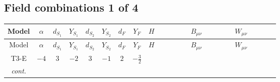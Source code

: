 \documentclass[8pt]{article}
\begin{document}
\begin{landscape}
\subsection*{Field combinations 1 of 4}
\begin{longtable}{@{}cccccccc >{\raggedright\arraybackslash}p{0.21\linewidth} >{\raggedright\arraybackslash}p{0.21\linewidth} >{\raggedright\arraybackslash}p{0.21\linewidth}@{}}
\toprule
Model & $\alpha$ & $d_{S_1}$ & $Y_{S_1}$ & $d_{S_2}$ & $Y_{S_2}$ & $d_F$ & $Y_F$ & $H$ & $B_{\mu\nu}$ & $W_{\mu\nu}$ \\
\midrule
\endfirsthead
\toprule
Model & $\alpha$ & $d_{S_1}$ & $Y_{S_1}$ & $d_{S_2}$ & $Y_{S_2}$ & $d_F$ & $Y_F$ & $H$ & $B_{\mu\nu}$ & $W_{\mu\nu}$ \\
\midrule
\endhead
T3-E & $-4$ & $3$ & $-2$ & $3$ & $-1$ & $2$ & $-\frac{3}{2}$ & \scriptsize\adjustbox{max width=\linewidth}{$\begin{gathered} +C_{\text{H2}} H_{a_1} H_{a_1}{}^{\dagger } \\ -H_{a_1} \mu ^2 H_{a_1}{}^{\dagger } \\ +\frac{2 \hbar  \overline{\lambda_5} H_{a_1} H_{a_2} \lambda_5 H_{a_1}{}^{\dagger } H_{a_2}{}^{\dagger }}{\epsilon }\end{gathered}$} & \scriptsize\adjustbox{max width=\linewidth}{$\begin{gathered} -\frac{23 \hbar  B_{\mu _1\mu _2}^2}{4 \epsilon } \\ -\hbar  \log \left(\frac{\bar{\mu}^{2}}{m_1^2}\right) B_{\mu _1\mu _2}^2 \\ -\frac{1}{4} \hbar  \log \left(\frac{\bar{\mu}^{2}}{m_2^2}\right) B_{\mu _1\mu _2}^2\end{gathered}$} & \scriptsize\adjustbox{max width=\linewidth}{$\begin{gathered} -\frac{5 \hbar  \left(W_{\mu _1\mu _2}^{A_1}\right){}^2}{6 \epsilon } \\ -\frac{1}{6} \hbar  \log \left(\frac{\bar{\mu}^{2}}{m_1^2}\right) \left(W_{\mu _1\mu _2}^{A_1}\right){}^2 \\ -\frac{1}{6} \hbar  \log \left(\frac{\bar{\mu}^{2}}{m_2^2}\right) \left(W_{\mu _1\mu _2}^{A_1}\right){}^2\end{gathered}$} \\
\textit{cont.} &  &  &  &  &  &  &  & \scriptsize\adjustbox{max width=\linewidth}{$\begin{gathered} +\frac{2 \hbar  \overline{\lambda_5} H_{a_1} H_{a_2} m_1^2 \lambda_5 H_{a_1}{}^{\dagger } H_{a_2}{}^{\dagger }}{m_1^2-m_2^2} \\ +\frac{2 \hbar  \log \left(\frac{\bar{\mu}^{2}}{m_1^2}\right) \overline{\lambda_5} H_{a_1} H_{a_2} m_1^2 \lambda_5 H_{a_1}{}^{\dagger } H_{a_2}{}^{\dagger }}{m_1^2-m_2^2} \\ -\frac{2 \hbar  \overline{\lambda_5} H_{a_1} H_{a_2} m_2^2 \lambda_5 H_{a_1}{}^{\dagger } H_{a_2}{}^{\dagger }}{m_1^2-m_2^2}\end{gathered}$} &  &  \\

\end{longtable}
\end{landscape}
\end{document}
